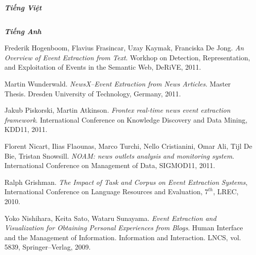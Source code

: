 \begin{thebibliography}{99}


\begin{flushright}
	{\Large\bf\emph{Tiếng Việt}}
\end{flushright}
$\;$	
\begin{flushright}
{\Large\bf\emph{Tiếng Anh}}
\end{flushright}
		 Frederik Hogenboom, Flavius Frasincar, Uzay Kaymak, Franciska De Jong. \emph{An Overview of Event Extraction from Text}. Workhop on Detection, Representation, and Exploitation of Events in the Semantic Web, DeRiVE, 2011.

		 Martin Wunderwald. \emph{NewsX--Event Extraction from News Articles}. Master Thesis. Dresden University of Technology, Germany, 2011.

		 Jakub Piskorski, Martin Atkinson. \emph{Frontex real-time news event extraction framework}. International Conference on Knowledge Discovery and Data Mining, KDD11, 2011. 

		  Florent Nicart, Ilias Flaounas, Marco Turchi, Nello Cristianini, Omar Ali, Tijl De Bie, Tristan Snowsill. \emph{NOAM: news outlets analysis and monitoring system}. International Conference on Management of Data, SIGMOD11, 2011.
	
		
		 Ralph Grishman.  \emph{The Impact of Task and Corpus on Event Extraction Systems}, International Conference on Language Resources and Evaluation, $7^{th}$, LREC, 2010. 

		 Yoko Nishihara, Keita Sato, Wataru Sunayama. \emph{Event Extraction and Visualization for Obtaining Personal Experiences from Blogs}. Human Interface and the Management of Information. Information and Interaction. LNCS, vol. 5839, Springer--Verlag, 2009.
		

\end{thebibliography}
